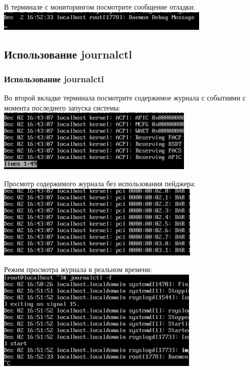 \documentclass{beamer}
\begin{document}
\begin{frame}[plain]
	В терминале с мониторингом посмотрите сообщение отладки:
	\\\includegraphics{13.png}
\end{frame}

\subsection{Использование journalctl}
\begin{frame}[plain]
	\frametitle{Использование journalctl}
	Во второй вкладке терминала посмотрите содержимое журнала с событиями с момента последнего запуска системы:
	\\\includegraphics{14.png}
\end{frame}
\begin{frame}[plain]
	Просмотр содержимого журнала без использования пейджера:
	\\\includegraphics{15.png}
\end{frame}
\begin{frame}[plain]
	Режим просмотра журнала в реальном времени:
	\\\includegraphics{16.png}
\end{frame}
\end{document}
